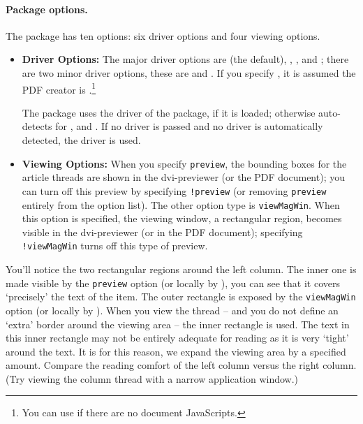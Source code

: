 \documentclass{article}
\begin{document}
\paragraph*{Package options.}
The package has ten options: six driver options and four viewing
options.
\begin{multicols}{2}\previewOn\viewMagWinOn
{}
\begin{itemize}
\item {}%
    \textbf{Driver Options:} The major driver options are  (the
    default), , , and ; there are two
    minor driver options, these are  and . If
    you specify , it is assumed the PDF creator is .\footnote{You can use  if there
    are no document JavaScripts.}

    The  package uses the driver of the  package,
    if it is loaded; otherwise  auto-detects for
    ,  and . If no driver is
    passed and no driver is automatically detected, the  driver
    is used.


    \item {}%
        \textbf{Viewing Options:} When you specify \texttt{preview}, the
        bounding boxes for the article threads are shown in the
        dvi-previewer (or the PDF document); you can turn off this preview
        by specifying \texttt{!preview} (or removing \texttt{preview}
        entirely from the option list). The other option type is
        \texttt{viewMagWin}. When this option is specified, the viewing window, a
        rectangular region, becomes visible in the dvi-previewer (or in the
        PDF document); specifying \texttt{!viewMagWin} turns off this type
        of preview.

\end{itemize}
\end{multicols}\noindent
You'll notice the two rectangular regions around the left column. The inner
one is made visible by the \texttt{preview} option (or locally by
), you can see that it covers `precisely' the text of the
item. The outer rectangle is exposed by the \texttt{viewMagWin} option (or
locally by ). When you view the thread -- and you do not
define an `extra' border around the viewing area -- the inner rectangle is
used. The text in this inner rectangle may not be entirely adequate for
reading as it is very `tight' around the text. It is for this reason, we
expand the viewing area by a specified amount. Compare the reading comfort of
the left column versus the right column. (Try viewing the column thread with
a narrow application window.)
\end{document}
